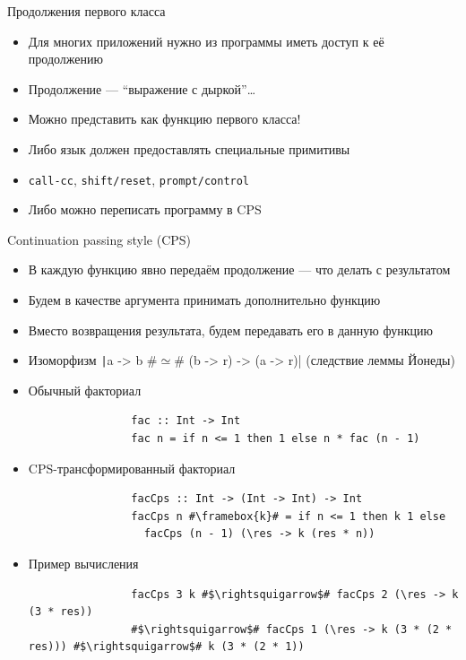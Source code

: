     \begin{frame}[fragile]{Продолжения первого класса}
        \begin{itemize}
            \item Для многих приложений нужно из программы иметь доступ к её продолжению
            \item Продолжение --- ``выражение с дыркой''\ldots
            \item Можно представить как функцию первого класса!
            \item Либо язык должен предоставлять специальные примитивы
            \item[\eg] \texttt{call-cc}, \texttt{shift/reset}, \texttt{prompt/control}
            \item Либо можно переписать программу в CPS
        \end{itemize}
    \end{frame}

    \begin{frame}[fragile]{Continuation passing style (CPS)}
        \begin{itemize}
            \item В каждую функцию явно передаём продолжение --- что делать с результатом
            \item Будем в качестве аргумента принимать дополнительно функцию
            \item Вместо возвращения результата, будем передавать его в данную функцию
            \item Изоморфизм \texttt|a -> b #$\simeq$# (b -> r) -> (a -> r)| (следствие леммы Йонеды)
            \item \pause Обычный факториал
            \begin{verbatim}
                fac :: Int -> Int
                fac n = if n <= 1 then 1 else n * fac (n - 1)
            \end{verbatim}
            \item \pause CPS-трансформированный факториал
            \begin{verbatim}
                facCps :: Int -> (Int -> Int) -> Int
                facCps n #\framebox{k}# = if n <= 1 then k 1 else
                  facCps (n - 1) (\res -> k (res * n))
            \end{verbatim}
            \item \pause Пример вычисления
            \begin{verbatim}
                facCps 3 k #$\rightsquigarrow$# facCps 2 (\res -> k (3 * res))
                #$\rightsquigarrow$# facCps 1 (\res -> k (3 * (2 * res))) #$\rightsquigarrow$# k (3 * (2 * 1))
            \end{verbatim}
        \end{itemize}
    \end{frame}

